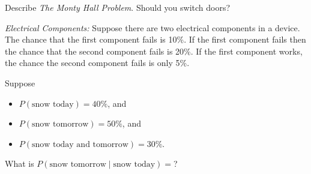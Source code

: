 \documentclass[addpoints,12pt]{exam}
\begin{document}
\begin{questions}
\addpoints

\question[2]
Describe \emph{The Monty Hall Problem}. Should you switch doors?

\vspace{2in}

\question[3]
\emph{Electrical Components:} Suppose there are two electrical components in a device. The chance that the first component fails is 10\%. If the first component fails then the chance that the second component fails is 20\%. If the first component works, the chance the second component fails is only 5\%.
\noaddpoints
{}
\addpoints


\question[1] Suppose 
\begin{itemize}
\item $P(\text{snow today})=40\%$, and 
\item $P(\text{snow tomorrow})=50\%$, and 
\item $P(\text{snow today and tomorrow})=30\%$. 
\end{itemize}
What is $P(\text{snow tomorrow}\mid \text{snow today})=$?


\end{questions}
\end{document}
